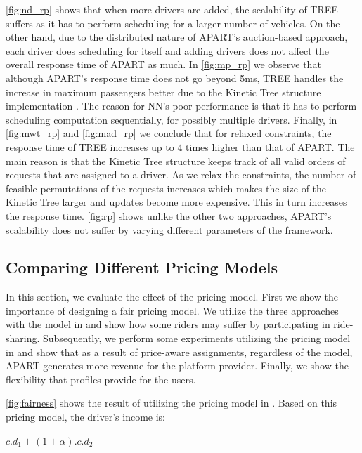 \cref{fig:nd_rp} shows that when more drivers are added, the scalability of TREE suffers as it has to perform scheduling for a larger number of vehicles. On the other hand, due to the distributed nature of APART's auction-based approach, each driver does scheduling for itself and adding drivers does not affect the overall response time of APART as much. In \cref{fig:mp_rp} we observe that although APART's response time does not go beyond 5ms, TREE handles the increase in maximum passengers better due to the Kinetic Tree structure implementation \cite{Huang14}. The reason for NN's poor performance is that it has to perform scheduling computation sequentially, for possibly multiple drivers. Finally, in \cref{fig:mwt_rp} and \cref{fig:mad_rp} we conclude that for relaxed constraints, the response time of TREE increases up to 4 times higher than that of APART. The main reason is that the Kinetic Tree structure keeps track of all valid orders of requests that are assigned to a driver. As we relax the constraints, the number of feasible permutations of the requests increases which makes the size of the Kinetic Tree larger and updates become more expensive. This in turn increases the response time. \cref{fig:rp} shows unlike the other two approaches, APART's scalability does not suffer by varying different parameters of the framework.

\subsection{Comparing Different Pricing Models}
\label{subsec:pricingexp}

In this section, we evaluate the effect of the pricing model. First we show the importance of designing a fair pricing model. We utilize the three approaches with the model in \cite{Ma13} and show how some riders may suffer by participating in ride-sharing. Subsequently, we perform some experiments utilizing the pricing model in \cite{Ma15} and show that as a result of price-aware assignments, regardless of the model, APART generates more revenue for the platform provider. Finally, we show the flexibility that profiles provide for the users. 

\cref{fig:fairness} shows the result of utilizing the pricing model in \cite{Ma13}. Based on this pricing model, the driver's income is:

\begin{center}
$c.d_1 + (1+\alpha).c.d_2$
\end{center}

